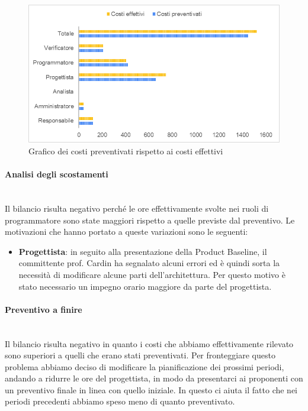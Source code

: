 \begin{figure} [H]
	\includegraphics[width=\linewidth]{./img/Grafici/40.png}
	\caption{Grafico dei costi preventivati rispetto ai costi effettivi}
\end{figure}

\paragraph*{Analisi degli scostamenti} \mbox{} \\
Il bilancio risulta negativo perché le ore effettivamente svolte nei ruoli di programmatore sono state maggiori rispetto a quelle previste dal preventivo.
Le motivazioni che hanno portato a queste variazioni sono le seguenti:
\begin{itemize}
	\item \textbf{Progettista}: in seguito alla presentazione della Product Baseline, il committente prof. Cardin ha segnalato alcuni errori ed è quindi sorta la necessità di modificare alcune parti dell'architettura. Per questo motivo è stato necessario un impegno orario maggiore da parte del progettista.
\end{itemize}
\paragraph*{Preventivo a finire} \mbox{} \\
Il bilancio risulta negativo in quanto i costi che abbiamo effettivamente rilevato sono superiori a quelli che erano stati preventivati. Per fronteggiare questo problema abbiamo deciso di modificare la pianificazione dei prossimi periodi, andando a ridurre le ore del progettista, in modo da presentarci ai proponenti con un preventivo finale in linea con quello iniziale. In questo ci aiuta il fatto che nei periodi precedenti abbiamo speso meno di quanto preventivato.


